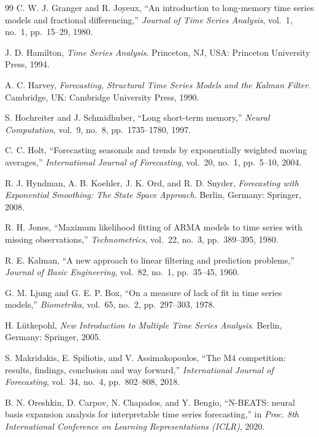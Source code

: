 \documentclass[conference]{IEEEtran}
\theoremstyle{definition}
\begin{document}
\begin{thebibliography}{99}
C. W. J. Granger and R. Joyeux, ``An introduction to long-memory time
series models and fractional differencing,''
\textit{Journal of Time Series Analysis}, vol.~1, no.~1, pp.~15--29, 1980.

J. D. Hamilton,
\textit{Time Series Analysis}.
Princeton, NJ, USA: Princeton University Press, 1994.

A. C. Harvey,
\textit{Forecasting, Structural Time Series Models and the Kalman Filter}.
Cambridge, UK: Cambridge University Press, 1990.

S. Hochreiter and J. Schmidhuber, ``Long short-term memory,''
\textit{Neural Computation}, vol.~9, no.~8, pp.~1735--1780, 1997.

C. C. Holt, ``Forecasting seasonals and trends by exponentially weighted
moving averages,'' \textit{International Journal of Forecasting}, vol.~20,
no.~1, pp.~5--10, 2004.

R. J. Hyndman, A. B. Koehler, J. K. Ord, and R. D. Snyder,
\textit{Forecasting with Exponential Smoothing: The State Space Approach}.
Berlin, Germany: Springer, 2008.

R. H. Jones, ``Maximum likelihood fitting of ARMA models to time series
with missing observations,''
\textit{Technometrics}, vol.~22, no.~3, pp.~389--395, 1980.

R. E. Kalman, ``A new approach to linear filtering and prediction problems,''
\textit{Journal of Basic Engineering}, vol.~82, no.~1, pp.~35--45, 1960.

G. M. Ljung and G. E. P. Box, ``On a measure of lack of fit in time series
models,'' \textit{Biometrika}, vol.~65, no.~2, pp.~297--303, 1978.

H. L{\"u}tkepohl,
\textit{New Introduction to Multiple Time Series Analysis}.
Berlin, Germany: Springer, 2005.

S. Makridakis, E. Spiliotis, and V. Assimakopoulos, ``The M4 competition:
results, findings, conclusion and way forward,''
\textit{International Journal of Forecasting}, vol.~34, no.~4,
pp.~802--808, 2018.

B. N. Oreshkin, D. Carpov, N. Chapados, and Y. Bengio,
``N-BEATS: neural basis expansion analysis for interpretable time series
forecasting,'' in \textit{Proc. 8th International Conference on Learning
Representations (ICLR)}, 2020.


\end{thebibliography}
\end{document}
